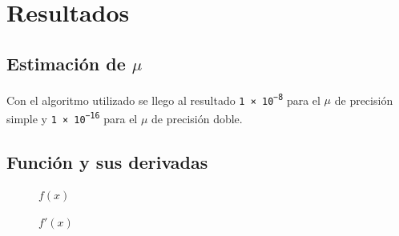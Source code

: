 \documentclass[11pt,a4paper]{article}
\begin{document}
\section{Resultados}

\subsection{Estimación de \( \mu \) }

Con el algoritmo utilizado se llego al resultado \texttt{\num{1e-8}} para el \(\mu\) de precisión simple y \texttt{\num{1e-16}} para el \(\mu\) de precisión doble.

\subsection{Función y sus derivadas}

\begin{figure}[H]
	\caption{\(f(x)\)}
	\label{fig:funcion}
\end{figure}

\begin{figure}[H]
	\caption{\(f'(x)\)}
	\label{fig:funcionderivada}
\end{figure}
\end{document}
